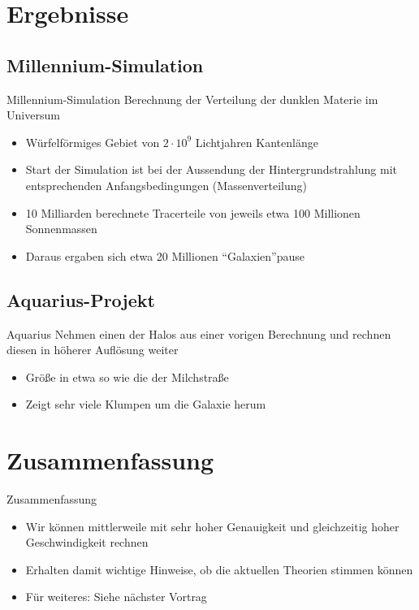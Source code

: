 \documentclass{beamer}
\begin{document}
\section{Ergebnisse}
\subsection*{Millennium-Simulation}
\begin{frame}{Millennium-Simulation}
  Berechnung der Verteilung der dunklen Materie im Universum
  \begin{itemize}
    \item Würfelförmiges Gebiet von $2\cdot 10^9$ Lichtjahren Kantenlänge
    \item Start der Simulation ist bei der Aussendung der Hintergrundstrahlung
      mit entsprechenden Anfangsbedingungen (Massenverteilung)
    \item 10 Milliarden berechnete Tracerteile von jeweils etwa 100 Millionen
      Sonnenmassen
      \pause
    \item Daraus ergaben sich etwa 20 Millionen "`Galaxien"'pause
  \end{itemize}
\end{frame}

\subsection*{Aquarius-Projekt}
\begin{frame}{Aquarius}
  Nehmen einen der Halos aus einer vorigen Berechnung und rechnen diesen in
  höherer Auflösung weiter
  \begin{itemize}
    \item Größe in etwa so wie die der Milchstraße
    \item Zeigt sehr viele Klumpen um die Galaxie herum
  \end{itemize}
\end{frame}

\section{Zusammenfassung}
\begin{frame}{Zusammenfassung}
  \begin{itemize}
  \item
    Wir können mittlerweile mit sehr hoher Genauigkeit und gleichzeitig hoher
    Geschwindigkeit rechnen
  \item Erhalten damit wichtige Hinweise, ob die aktuellen Theorien stimmen
    können
  \item
    Für weiteres: Siehe nächster Vortrag
  \end{itemize}
\end{frame}
\end{document}
